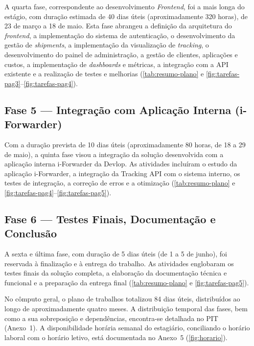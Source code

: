 \documentclass[a4paper,12pt]{report}
\begin{document}
A quarta fase, correspondente ao desenvolvimento \textit{Frontend}, foi a mais longa do estágio, com duração estimada de 40 dias úteis (aproximadamente 320 horas), de 23 de março a 18 de maio. Esta fase abrangeu a definição da arquitetura do \textit{frontend}, a implementação do sistema de autenticação, o desenvolvimento da gestão de \textit{shipments}, a implementação da visualização de \textit{tracking}, o desenvolvimento do painel de administração, a gestão de clientes, aplicações e custos, a implementação de \textit{dashboards} e métricas, a integração com a API existente e a realização de testes e melhorias (\autoref{tab:resumo-plano} e \autoref{fig:tarefas-pag3}--\autoref{fig:tarefas-pag4}).

\subsection{Fase 5 --- Integração com Aplicação Interna (i-Forwarder)}

Com a duração prevista de 10 dias úteis (aproximadamente 80 horas, de 18 a 29 de maio), a quinta fase visou a integração da solução desenvolvida com a aplicação interna i-Forwarder da Devlop. As atividades incluíram o estudo da aplicação i-Forwarder, a integração da Tracking API com o sistema interno, os testes de integração, a correção de erros e a otimização (\autoref{tab:resumo-plano} e \autoref{fig:tarefas-pag4}--\autoref{fig:tarefas-pag5}).

\subsection{Fase 6 --- Testes Finais, Documentação e Conclusão}

A sexta e última fase, com duração de 5 dias úteis (de 1 a 5 de junho), foi reservada à finalização e à entrega do trabalho. As atividades englobaram os testes finais da solução completa, a elaboração da documentação técnica e funcional e a preparação da entrega final (\autoref{tab:resumo-plano} e \autoref{fig:tarefas-pag5}).

No cômputo geral, o plano de trabalhos totalizou 84 dias úteis, distribuídos ao longo de aproximadamente quatro meses. A distribuição temporal das fases, bem como a sua sobreposição e dependências, encontra-se detalhada no PIT (Anexo~1). A disponibilidade horária semanal do estagiário, conciliando o horário laboral com o horário letivo, está documentada no Anexo~5 (\autoref{fig:horario}).

\end{document}
